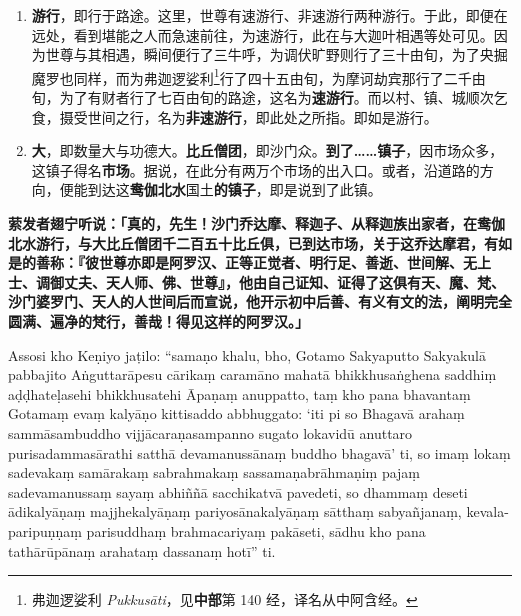 \begin{enumerate}
\item \textbf{游行}，即行于路途。这里，世尊有速游行、非速游行两种游行。于此，即便在远处，看到堪能之人而急速前往，为速游行，此在与大迦叶相遇等处可见。因为世尊与其相遇，瞬间便行了三牛呼，为调伏旷野则行了三十由旬，为了央掘魔罗也同样，而为弗迦逻娑利\footnote{弗迦逻娑利 \textit{Pukkusāti}，见\textbf{中部}第 140 经，译名从中阿含经。}行了四十五由旬，为摩诃劫宾那行了二千由旬，为了有财者行了七百由旬的路途，这名为\textbf{速游行}。而以村、镇、城顺次乞食，摄受世间之行，名为\textbf{非速游行}，即此处之所指。即如是游行。
\item \textbf{大}，即数量大与功德大。\textbf{比丘僧团}，即沙门众。\textbf{到了……镇子}，因市场众多，这镇子得名\textbf{市场}。据说，在此分有两万个市场的出入口。或者，沿道路的方向，便能到达这\textbf{鸯伽北水}国土\textbf{的镇子}，即是说到了此镇。\end{enumerate}

\textbf{萦发者翅宁听说：「真的，先生！沙门乔达摩、释迦子、从释迦族出家者，在鸯伽北水游行，与大比丘僧团千二百五十比丘俱，已到达市场，关于这乔达摩君，有如是的善称：『彼世尊亦即是阿罗汉、正等正觉者、明行足、善逝、世间解、无上士、调御丈夫、天人师、佛、世尊』，他由自己证知、证得了这俱有天、魔、梵、沙门婆罗门、天人的人世间后而宣说，他开示初中后善、有义有文的法，阐明完全圆满、遍净的梵行，善哉！得见这样的阿罗汉。」}

Assosi kho Keṇiyo jaṭilo: “samaṇo khalu, bho, Gotamo Sakyaputto Sakyakulā pabbajito Aṅguttarāpesu cārikaṃ caramāno mahatā bhikkhusaṅghena saddhiṃ aḍḍhateḷasehi bhikkhusatehi Āpaṇaṃ anuppatto, taṃ kho pana bhavantaṃ Gotamaṃ evaṃ kalyāṇo kittisaddo abbhuggato: ‘iti pi so Bhagavā arahaṃ sammāsambuddho vijjācaraṇasampanno sugato lokavidū anuttaro purisadammasārathi satthā devamanussānaṃ buddho bhagavā’ ti, so imaṃ lokaṃ sadevakaṃ samārakaṃ sabrahmakaṃ sassamaṇabrāhmaṇiṃ pajaṃ sadevamanussaṃ sayaṃ abhiññā sacchikatvā pavedeti, so dhammaṃ deseti ādikalyāṇaṃ majjhekalyāṇaṃ pariyosānakalyāṇaṃ sātthaṃ sabyañjanaṃ, kevala-paripuṇṇaṃ parisuddhaṃ brahmacariyaṃ pakāseti, sādhu kho pana tathārūpānaṃ arahataṃ dassanaṃ hotī” ti.

